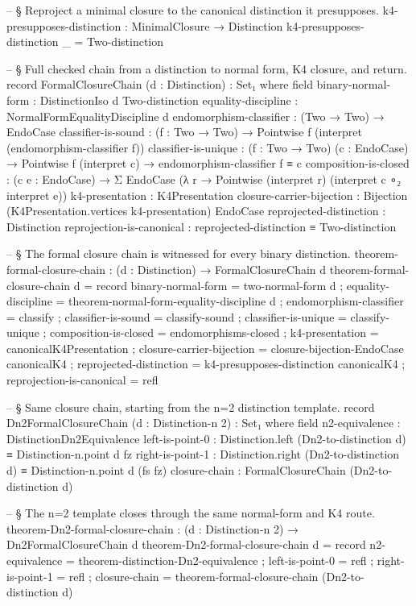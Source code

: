 \documentclass[11pt]{article}
\begin{document}
\begin{code}
-- § Reproject a minimal closure to the canonical distinction it presupposes.
k4-presupposes-distinction : MinimalClosure → Distinction
k4-presupposes-distinction _ = Two-distinction

-- § Full checked chain from a distinction to normal form, K4 closure, and return.
record FormalClosureChain (d : Distinction) : Set₁ where
  field
    binary-normal-form        : DistinctionIso d Two-distinction
    equality-discipline       : NormalFormEqualityDiscipline d
    endomorphism-classifier   : (Two → Two) → EndoCase
    classifier-is-sound       : (f : Two → Two) →
      Pointwise f (interpret (endomorphism-classifier f))
    classifier-is-unique      :
      (f : Two → Two) (c : EndoCase) →
      Pointwise f (interpret c) → endomorphism-classifier f ≡ c
    composition-is-closed     :
      (c e : EndoCase) →
      Σ EndoCase (λ r → Pointwise (interpret r) (interpret c ∘₂ interpret e))
    k4-presentation           : K4Presentation
    closure-carrier-bijection : Bijection (K4Presentation.vertices k4-presentation) EndoCase
    reprojected-distinction   : Distinction
    reprojection-is-canonical : reprojected-distinction ≡ Two-distinction

-- § The formal closure chain is witnessed for every binary distinction.
theorem-formal-closure-chain :
  (d : Distinction) → FormalClosureChain d
theorem-formal-closure-chain d = record
  { binary-normal-form        = two-normal-form d
  ; equality-discipline       = theorem-normal-form-equality-discipline d
  ; endomorphism-classifier   = classify
  ; classifier-is-sound       = classify-sound
  ; classifier-is-unique      = classify-unique
  ; composition-is-closed     = endomorphisms-closed
  ; k4-presentation           = canonicalK4Presentation
  ; closure-carrier-bijection = closure-bijection-EndoCase canonicalK4
  ; reprojected-distinction   = k4-presupposes-distinction canonicalK4
  ; reprojection-is-canonical = refl
  }

-- § Same closure chain, starting from the n=2 distinction template.
record Dn2FormalClosureChain (d : Distinction-n 2) : Set₁ where
  field
    n2-equivalence       : DistinctionDn2Equivalence
    left-is-point-0      : Distinction.left (Dn2-to-distinction d) ≡ Distinction-n.point d fz
    right-is-point-1     : Distinction.right (Dn2-to-distinction d) ≡ Distinction-n.point d (fs fz)
    closure-chain        : FormalClosureChain (Dn2-to-distinction d)

-- § The n=2 template closes through the same normal-form and K4 route.
theorem-Dn2-formal-closure-chain :
  (d : Distinction-n 2) → Dn2FormalClosureChain d
theorem-Dn2-formal-closure-chain d = record
  { n2-equivalence     = theorem-distinction-Dn2-equivalence
  ; left-is-point-0    = refl
  ; right-is-point-1   = refl
  ; closure-chain      = theorem-formal-closure-chain (Dn2-to-distinction d)
  }
\end{code}
\end{document}
